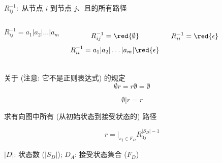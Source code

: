 \begin{frame}{}
  \begin{center}

    \vspace{0.30cm}
    $R^{-1}_{ij}:$ \pause 从节点 $i$ 到节点 $j$、且的所有路径
  \end{center}

  \pause
  \vspace{0.30cm}
  \begin{columns}
      \[
        R^{-1}_{ij} = a_{1} | a_{2} | \dots | a_{m}
      \]

      \[
        R^{-1}_{ij} = \red{\emptyset}
      \]
      \pause
      \[
        R^{-1}_{ii} = a_{1} | a_{2} | \dots | a_{m} | \red{\epsilon}
      \]

      \[
        R^{-1}_{ii} = \red{\epsilon}
      \]
  \end{columns}
\end{frame}

\begin{frame}{}
  \begin{center}
    关于 \red{$\emptyset$} (注意: 它不是正则表达式) 的规定 
    \[
      \emptyset r = r \emptyset = \emptyset
    \]

    \[
      \emptyset | r = r
    \]
  \end{center}
\end{frame}

\begin{frame}{}
  \begin{center}

    \vspace{0.50cm}
    求有向图中所有 (从初始状态到接受状态的) 路径

    \pause
    \vspace{0.50cm}
    \[
      r = |_{s_{j} \in F_{D}} R^{|S_{D}| - 1}_{0j}
    \]
  \end{center}
\end{frame}

\begin{frame}{}

  \begin{center}
    $|D|$: 状态数 ($|S_{D}|$); \qquad $D_{A}$: 接受状态集合 ($F_{D}$)
  \end{center}
\end{frame}

